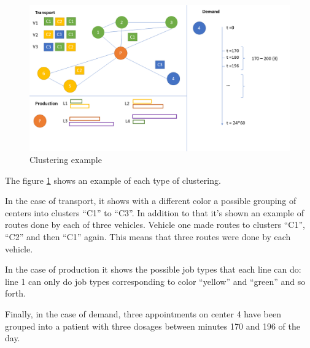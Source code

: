 \begin{figure}
	\centering	
		\includegraphics[width=\textwidth]{imagenes/clustering.png}
	\caption{Clustering example}
	\label{fig:clustering}
\end{figure}


The figure \ref{fig:clustering} shows an example of each type of clustering. 


In the case of transport, it shows with a different color a possible grouping of centers into clusters "`C1"' to "`C3"'. In addition to that it's shown an example of routes done by each of three vehicles. Vehicle one made routes to clusters "`C1"', "`C2"' and then "`C1"' again. This means that three routes were done by each vehicle.


In the case of production it shows the possible job types that each line can do: line 1 can only do job types corresponding to color "`yellow"' and "`green"' and so forth.


Finally, in the case of demand, three appointments on center 4 have been grouped into a patient with three dosages between minutes 170 and 196 of the day.


